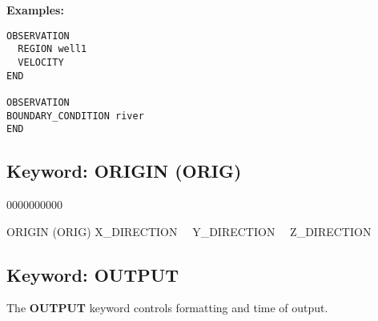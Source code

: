 \begin{mdframed}

{\noindent\bf Examples:}
\begin{verbatim}
OBSERVATION
  REGION well1
  VELOCITY
END

OBSERVATION
BOUNDARY_CONDITION river
END
\end{verbatim}
\end{mdframed}

\hyperlink{target_key}{\return}


\newpage
\protect\hypertarget{target_orig}{}

\subsection{Keyword: ORIGIN (ORIG)}
\begin{deflist}{0000000000}
\item[ORIGIN (ORIG)] X\_DIRECTION \ \ Y\_DIRECTION \ \ Z\_DIRECTION
\end{deflist}

\hyperlink{target_key}{\return}



\newpage
\protect\hypertarget{target_output}{}

\subsection{Keyword: OUTPUT}

 The {\bf OUTPUT} keyword controls formatting and time of output.


